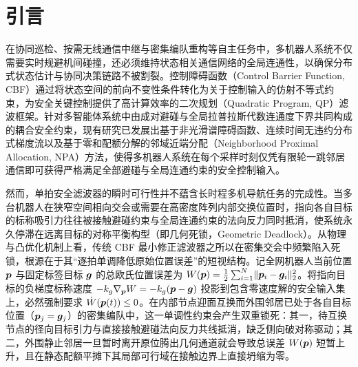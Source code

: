 \section{引言}\label{sec:intro}

在协同巡检、按需无线通信中继与密集编队重构等自主任务中，多机器人系统不仅需要实时规避机间碰撞，还必须维持状态相关通信网络的全局连通性，以确保分布式状态估计与协同决策链路不被割裂\cite{yang2010decentralized,sabattini2013decentralized,ong2021connectivity}。控制障碍函数（Control Barrier Function, CBF）\cite{ames2017cbf,breeden2022sampled}通过将状态空间的前向不变性条件转化为关于控制输入的仿射不等式约束，为安全关键控制提供了高计算效率的二次规划（Quadratic Program, QP）滤波框架。针对多智能体系统中由成对避碰与全局拉普拉斯代数连通度下界共同构成的耦合安全约束，现有研究已发展出基于非光滑谱障碍函数\cite{ong2021connectivity}、连续时间无违约分布式梯度流\cite{tan2025violationfree}以及基于零和配额分解的邻域近端分配（Neighborhood Proximal Allocation, NPA）方法，使得多机器人系统在每个采样时刻仅凭有限轮一跳邻居通信即可获得严格满足全部避碰与全局连通约束的安全控制输入。

然而，单拍安全滤波器的瞬时可行性并不蕴含长时程多机导航任务的完成性。当多台机器人在狭窄空间相向交会或需要在高密度阵列内部交换位置时，指向各自目标的标称吸引力往往被接触避碰约束与全局连通约束的法向反力同时抵消，使系统永久停滞在远离目标的对称平衡构型（即几何死锁，Geometric Deadlock）\cite{reis2021,grover2023deadlock,tan2024equilibria,mestres2026filters}。从物理与凸优化机制上看，传统 CBF 最小修正滤波器之所以在密集交会中频繁陷入死锁，根源在于其“逐拍单调降低原始位置误差”的短视结构。记全网机器人当前位置 $\boldsymbol{p}$ 与固定标签目标 $\boldsymbol{g}$ 的总欧氏位置误差为 $W(\boldsymbol{p})=\frac12\sum_{i=1}^N\lVert\boldsymbol{p}_i-\boldsymbol{g}_i\rVert_2^2$。将指向目标的负梯度标称速度 $-k_g\nabla_{\boldsymbol{p}}W=-k_g(\boldsymbol{p}-\boldsymbol{g})$ 投影到包含零速度解的安全输入集上，必然强制要求 $\dot W(\boldsymbol{p}(t))\le 0$\cite{allibhoy2024safegradient}。在内部节点迎面互换而外围邻居已处于各自目标位置（$\boldsymbol{p}_j=\boldsymbol{g}_j$）的密集编队中，这一单调性约束会产生双重锁死：其一，待互换节点的径向目标引力与直接接触避碰法向反力共线抵消，缺乏侧向破对称驱动；其二，外围静止邻居一旦暂时离开原位腾出几何通道就会导致总误差 $W(\boldsymbol{p})$ 短暂上升，且在静态配额平摊下其局部可行域在接触边界上直接坍缩为零\cite{karagoz2014navigation}。

